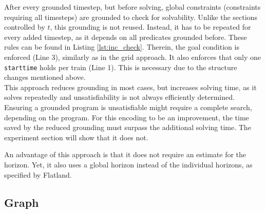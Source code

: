\documentclass{llncs}
\begin{document}
\begin{multicols*}{2}
After every grounded timestep, but before solving, global constraints (constraints requiring all timesteps) are grounded to check for solvability. Unlike the sections controlled by $t$, this grounding is not reused. Instead, it has to be repeated for every added timestep, as it depends on all predicates grounded before. These rules can be found in Listing \ref{lst:inc_check}. Therein, the goal condition is enforced (Line 3), similarly as in the grid approach. It also enforces that only one \texttt{starttime} holds per train (Line 1). This is necessary due to the structure changes mentioned above.\\

This approach reduces grounding in most cases, but increases solving time, as it solves repeatedly and unsatisfiability is not always efficiently determined. Ensuring a grounded program is unsatisfiable might require a complete search, depending on the program. For this encoding to be an improvement, the time saved by the reduced grounding must surpass the additional solving time. The experiment section will show that it does not.

An advantage of this approach is that it does not require an estimate for the horizon. Yet, it also uses a global horizon instead of the individual horizons, as specified by Flatland.

\subsection*{Graph}
\begin{figure}[t]
\begin{minipage}[t]{0.45\textwidth}
    \centering
\end{minipage}
\end{figure}
\end{multicols*}
\end{document}
